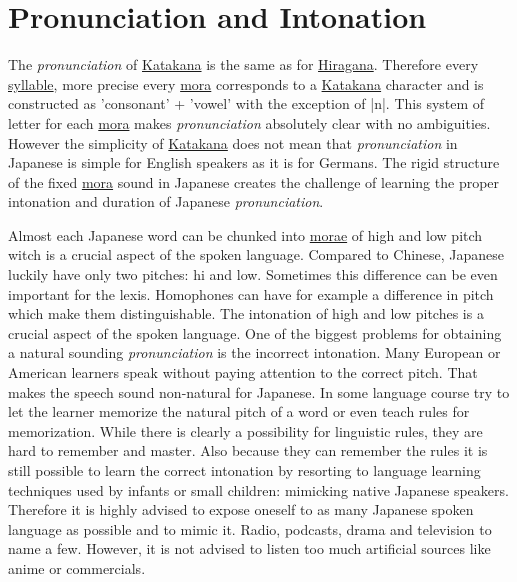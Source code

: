 \section{Pronunciation and Intonation}
\label{sec:PronunciationAndIntonation}
\label{sec:Pronuciation}
\label{sec:Intonation}

The \textit{pronunciation} of \hyperref[sec:Katakana]{Katakana} is the same as
for \hyperref[sec:Hiragana]{Hiragana}. Therefore every
\hyperref[sec:Syllable]{syllable}, more precise every \hyperref[sec:Mora]{mora}
corresponds to a \hyperref[sec:Katakana]{Katakana} character and is constructed
as 'consonant' + 'vowel' with the exception of |n|. This system of letter for
each \hyperref[sec:Mora]{mora} makes \textit{pronunciation} absolutely clear
with no ambiguities.  However the simplicity of
\hyperref[sec:Katakana]{Katakana} does not mean that \textit{pronunciation} in
Japanese is simple for English speakers as it is for Germans.  The rigid
structure of the fixed \hyperref[sec:Mora]{mora} sound in Japanese creates the
challenge of learning the proper intonation and duration of Japanese
\textit{pronunciation}.

Almost each Japanese word can be chunked into \hyperref[sec:Mora]{morae} of
high and low pitch witch is a crucial aspect of the spoken language. Compared
to Chinese, Japanese luckily have only two pitches: hi and low. Sometimes this
difference can be even important for the lexis. Homophones can have for example
a difference in pitch which make them distinguishable.  The intonation of high
and low pitches is a crucial aspect of the spoken language. One of the biggest
problems for obtaining a natural sounding \textit{pronunciation} is the
incorrect intonation. Many European or American learners speak without paying
attention to the correct pitch. That makes the speech sound non-natural for
Japanese. In some language course try to let the learner memorize the natural
pitch of a word or even teach rules for memorization. While there is clearly a
possibility for linguistic rules, they are hard to remember and master. Also
because they can remember the rules it is still possible to learn the correct
intonation by resorting to language learning techniques used by infants or
small children: mimicking native Japanese speakers. Therefore it is highly
advised to expose oneself to as many Japanese spoken language as possible and
to mimic it. Radio, podcasts, drama and television to name a few. However, it
is not advised to listen too much artificial sources like anime or commercials.

